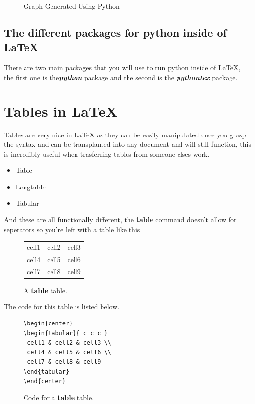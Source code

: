 \documentclass[12pt, letterpaper, oneside]{article} \usepackage[utf8]{inputenc}
\newlength\figureheight
\newlength\figurewidth
\begin{document}
\begin{figure}[H]
	\centering
\setlength\figureheight{3.5in}
\setlength\figurewidth{\linewidth}
	\caption{Graph Generated Using Python}
\end{figure}

\subsection{The different packages for python inside of \LaTeX{}}

There are two main packages that you will use to run python inside of \LaTeX{}, the first one is the\textbf{\emph{python}} package and the second is the \textbf{\emph{pythontex}} package. 

\pagebreak

\section{Tables in \LaTeX{}}

Tables are very nice in \LaTeX{} as they can be easily manipulated once you grasp the syntax and can be transplanted into any document and will still function, this is incredibly useful when trasferring tables from someone elses work.

\begin{itemize}
	\item Table
	\item Longtable
	\item Tabular
\end{itemize}


And these are all functionally different, the \textbf{table} command doesn't allow for seperators so you're left with a table like this

\begin{figure}[H]
\begin{center}
\begin{tabular}{ c c c }
 cell1 & cell2 & cell3 \\ 
 cell4 & cell5 & cell6 \\  
 cell7 & cell8 & cell9    
\end{tabular}
\end{center}
	\caption{A \textbf{table} table.}
\end{figure}

The code for this table is listed below.

\begin{figure}[H]
\begin{lstlisting}
\begin{center}
\begin{tabular}{ c c c }
 cell1 & cell2 & cell3 \\ 
 cell4 & cell5 & cell6 \\  
 cell7 & cell8 & cell9    
\end{tabular}
\end{center}
\end{lstlisting}
	\caption{Code for a \textbf{table} table.}
\end{figure}
\end{document}
